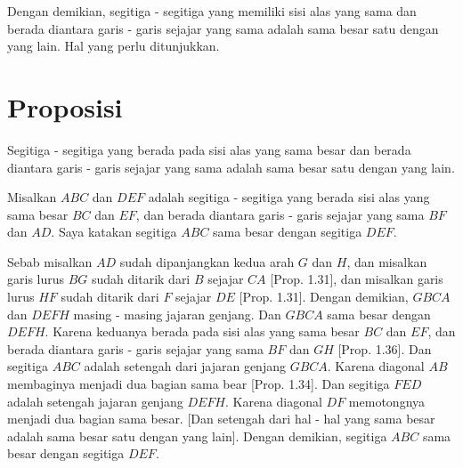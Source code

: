 \documentclass[a4paper]{book}
\begin{document}
Dengan demikian, segitiga - segitiga yang memiliki sisi alas yang sama dan 
berada diantara garis - garis sejajar yang sama adalah sama besar satu dengan 
yang lain. Hal yang perlu ditunjukkan.

\section*{\centering Proposisi \thesection} 
Segitiga - segitiga yang berada pada sisi alas yang sama besar dan berada 
diantara garis - garis sejajar yang sama adalah sama besar satu dengan 
yang lain.  
\begin{center}
\end{center}
Misalkan $ABC$ dan $DEF$ adalah segitiga - segitiga yang berada sisi alas yang
sama besar $BC$ dan $EF$, dan berada diantara garis - garis sejajar yang sama
$BF$ dan $AD$. Saya katakan segitiga $ABC$ sama besar dengan segitiga $DEF$.

Sebab misalkan $AD$ sudah dipanjangkan kedua arah $G$ dan $H$, dan misalkan 
garis lurus $BG$ sudah ditarik dari $B$ sejajar $CA$ [Prop. 1.31], dan misalkan
garis lurus $HF$ sudah ditarik dari $F$ sejajar $DE$ [Prop. 1.31]. Dengan 
demikian, $GBCA$ dan $DEFH$ masing - masing jajaran genjang. Dan $GBCA$ sama 
besar dengan $DEFH$. Karena keduanya berada pada sisi alas yang sama besar 
$BC$ dan $EF$, dan berada diantara garis - garis sejajar yang sama $BF$ dan 
$GH$ [Prop. 1.36]. Dan segitiga $ABC$ adalah setengah dari jajaran genjang 
$GBCA$. Karena diagonal $AB$ membaginya menjadi dua bagian sama bear 
[Prop. 1.34]. Dan segitiga $FED$  adalah setengah jajaran genjang $DEFH$.
Karena diagonal $DF$ memotongnya menjadi dua bagian sama besar. [Dan setengah
dari hal - hal yang sama besar adalah sama besar satu dengan yang lain]. 
Dengan demikian, segitiga $ABC$ sama besar dengan segitiga $DEF$.
\end{document}
